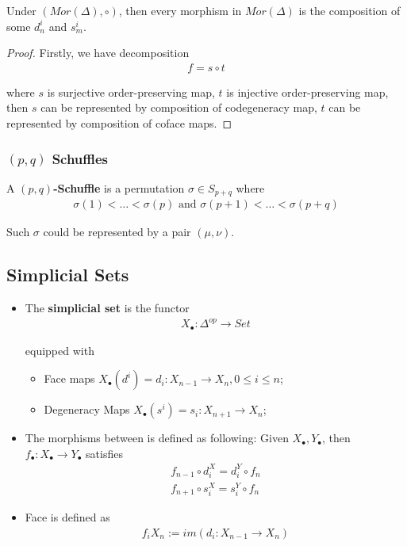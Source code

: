 \documentclass[Total.tex]{subfiles}
\begin{document}
			\begin{proposition}
				Under $(Mor(\Delta),\circ)$, then every morphism in $Mor(\Delta)$ is the composition of some $d^i_n$ and $s^i_m$.
			\end{proposition}
			\begin{proof}
				Firstly, we have decomposition
				\begin{gather*}
					f=s\circ t
				\end{gather*}
				
				where $s$ is surjective order-preserving map, $t$ is injective order-preserving map, then $s$ can be represented by composition of codegeneracy map, $t$ can be represented by composition of coface maps.
			\end{proof}
			\subsubsection{$(p,q)$ Schuffles}
				\begin{Def}
					A \textbf{$(p,q)$-Schuffle} is a permutation $\sigma\in S_{p+q}$ where
					\begin{gather*}
						\sigma(1)<\dots<\sigma(p) \text{ and } \sigma(p+1)<\dots<\sigma(p+q)
					\end{gather*}
				\end{Def}

				Such $\sigma$ could be represented by a pair $(\mu,\nu)$.
			\subsection{Simplicial Sets}
			\begin{Def}
				\begin{itemize}
					\item 
					The \textbf{simplicial set} is the functor
					\begin{gather*}
						X_\bullet:\Delta^{op}\rightarrow Set
					\end{gather*}
					
					equipped with 
					\begin{itemize}
						\item Face maps $X_\bullet(d^i)=d_i:X_{n-1}\rightarrow X_{n},0\leq i\leq n$;
						\item Degeneracy Maps $X_\bullet(s^i)=s_i:X_{n+1}\rightarrow X_{n}$;
					\end{itemize}
					\item The morphisms between is defined as following: Given $X_\bullet,Y_\bullet$, then $f_\bullet:X_\bullet\rightarrow Y_\bullet$ satisfies
					\begin{gather*}
						f_{n-1}\circ d_i^X=d_i^Y\circ f_n\\
						f_{n+1}\circ s_i^X=s_i^Y\circ f_n
					\end{gather*}
					\item Face is defined as
					\begin{gather*}
						f_iX_n:=im(d_i:X_{n-1}\rightarrow X_n)
					\end{gather*}
				\end{itemize}
			\end{Def}
			
\end{document}
